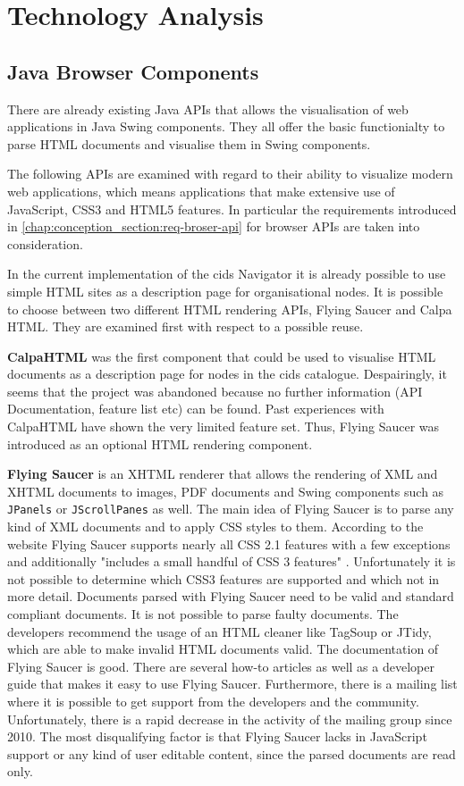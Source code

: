 \chapter{Technology Analysis}\label{chap:tech_analysis}
	
\section{Java Browser Components}\label{chap:browser_api_comparison}
There are already existing Java APIs that allows the visualisation of web applications in Java Swing components.
They all offer the basic functionialty to parse HTML documents and visualise them in Swing components.

The following APIs are examined with regard to their ability to visualize modern web applications, which means applications that make extensive use of JavaScript, CSS3 and HTML5 features.
In particular the requirements introduced in \ref{chap:conception_section:req-broser-api} for browser APIs are taken into consideration.

In the current implementation of the cids Navigator it is already possible to use simple HTML sites as a description page for organisational nodes.
It is possible to choose  between two different HTML rendering APIs, Flying Saucer and Calpa HTML.
They are examined first with respect to a possible reuse.
 
\textbf{CalpaHTML} was the first component that could be used to visualise HTML documents as a description page for nodes in the cids catalogue.
Despairingly, it seems that the project was abandoned because no further information (API Documentation, feature list etc) can be found. 
Past experiences with CalpaHTML have shown the very limited feature set.
Thus, Flying Saucer was introduced as an optional HTML rendering component.

\textbf{Flying Saucer} is an XHTML renderer that allows the rendering of XML and XHTML documents to images, PDF documents and Swing components such as \texttt{JPanels} or \texttt{JScrollPanes} as well.
The main idea of Flying Saucer is to parse any kind of XML documents and to apply CSS styles to them.
According to the website Flying Saucer supports nearly all CSS 2.1 features with a few exceptions and additionally "includes a small handful of CSS 3 features" \autocite{tech-ana:flying-saucer}.
Unfortunately it is not possible to determine which CSS3 features are supported and which not in more detail.
Documents parsed with Flying Saucer need to be valid and standard compliant documents.
It is not possible to parse faulty documents.
The developers recommend the usage of an HTML cleaner like TagSoup or JTidy, which are able to make invalid HTML documents valid.
The documentation of Flying Saucer is good.
There are several how-to articles as well as a developer guide that makes it easy to use Flying Saucer.
Furthermore, there is a mailing list where it is possible to get support from the developers and the community.
Unfortunately, there is a rapid decrease in the activity of the mailing group since 2010.
The most disqualifying factor is that Flying Saucer lacks in JavaScript support or any kind of user editable content, since the parsed documents are read only.

